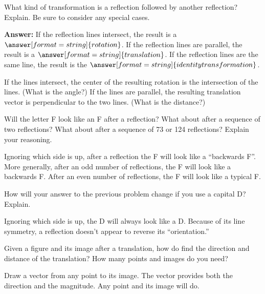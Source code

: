 \documentclass[nooutcomes]{ximera}
\begin{document}
\begin{question}
What kind of transformation is a reflection followed by another reflection?  Explain.  Be sure to consider any special cases.  

\textbf{Answer:} If the reflection lines intersect, the result is a $\answer[format=string]{rotation}$.  If the reflection lines are parallel, the result is a $\answer[format=string]{translation}$. If the reflection lines are the same line, the result is the $\answer[format=string]{identity transformation}$.
\begin{feedback}[correct]
If the lines intersect, the center of the resulting rotation is the intersection of the lines.  (What is the angle?) If the lines are parallel, the resulting translation vector is perpendicular to the two lines. (What is the distance?)
\end{feedback}
\end{question}

\begin{question}
Will the letter F look like an F after a reflection?  What about after a sequence of two reflections?  What about after a sequence of 73 or 124 reflections?  Explain your reasoning.  
\begin{freeResponse}
\begin{hint}
Ignoring which side is up, after a reflection the F will look like a ``backwards F''.  More generally, after an odd number of reflections, the F will look like a backwards F.  After an even number of reflections, the F will look like a typical F.  
\end{hint}
\end{freeResponse}
\end{question}

\begin{question}
How will your answer to the previous problem change if you use a capital D?  Explain.  
\begin{freeResponse}
\begin{hint}
Ignoring which side is up, the D will always look like a D.  Because of its line symmetry, a reflection doesn't appear to reverse its ``orientation.''  
\end{hint}
\end{freeResponse}
\end{question}

\begin{question}
Given a figure and its image after a translation, how do find the direction and distance of the translation?    How many points and images do you need?  
\begin{freeResponse}
\begin{hint}
Draw a vector from any point to its image.  The vector provides both the direction and the magnitude.  Any point and its image will do.  
\end{hint}
\end{freeResponse}
\end{question}
\end{document}
